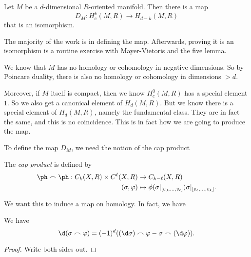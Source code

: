 \documentclass[a4paper]{article}
\begin{document}
\begin{thm}
  Let $M$ be a $d$-dimensional $R$-oriented manifold. Then there is a map
  \[
    D_M: H^k_c(M, R) \to H_{d - k}(M, R)
  \]
  that is an isomorphism.
\end{thm}
The majority of the work is in defining the map. Afterwards, proving it is an isomorphism is a routine exercise with Mayer-Vietoris and the five lemma.

We know that $M$ has no homology or cohomology in negative dimensions. So by Poincare duality, there is also no homology or cohomology in dimensions $> d$.

Moreover, if $M$ itself is compact, then we know $H^0_c(M, R)$ has a special element $1$. So we also get a canonical element of $H_d(M, R)$. But we know there is a special element of $H_d(M, R)$, namely the fundamental class. They are in fact the same, and this is no coincidence. This is in fact how we are going to produce the map.

To define the map $D_M$, we need the notion of the cap product
\begin{defi}
  The \emph{cap product} is defined by
  \begin{align*}
    \ph \frown \ph : C_k(X, R) \times C^\ell(X, R) &\to C_{k - \ell} (X, R)\\
    (\sigma, \varphi) &\mapsto \phi(\sigma|_{[v_0, \ldots, v_\ell]}) \sigma|_{[v_{\ell}, \ldots, v_k]}.
  \end{align*}
\end{defi}
We want this to induce a map on homology. In fact, we have
\begin{lemma}
  We have
  \[
    \d(\sigma \frown \varphi) = (-1)^d ((\d \sigma) \frown \varphi - \sigma \frown (\d \varphi)).
  \]
\end{lemma}

\begin{proof}
  Write both sides out.
\end{proof}
\end{document}
